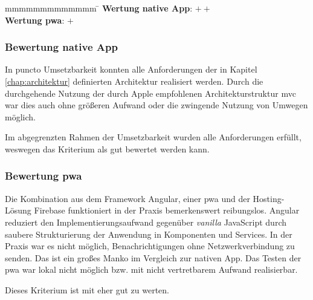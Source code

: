 \begin{tabbing}
	mmmmmmmmmmmmm				\= \kill
	\textbf{Wertung native App}: \> $++$ \\
	\textbf{Wertung \ac{pwa}}: \> $+$
\end{tabbing}

\subsubsection{Bewertung native App}
In puncto Umsetzbarkeit konnten alle Anforderungen der in Kapitel \ref{chap:architektur} definierten Architektur realisiert werden. Durch die durchgehende Nutzung der durch Apple empfohlenen Architekturstruktur \ac{mvc} war dies auch ohne größeren Aufwand oder die zwingende Nutzung von Umwegen möglich.

Im abgegrenzten Rahmen der Umsetzbarkeit wurden alle Anforderungen erfüllt, weswegen das Kriterium als gut bewertet werden kann.

\subsubsection{Bewertung \ac{pwa}}
Die Kombination aus dem Framework Angular, einer \ac{pwa} und der Hosting-Lösung Firebase funktioniert in der Praxis bemerkenswert reibungslos. Angular reduziert den Implementierungsaufwand gegenüber \textit{vanilla} JavaScript durch saubere Strukturierung der Anwendung in Komponenten und Services. In der Praxis war es nicht möglich, Benachrichtigungen ohne Netzwerkverbindung zu senden. Das ist ein großes Manko im Vergleich zur nativen App. Das Testen der \ac{pwa} war lokal nicht möglich bzw. mit nicht vertretbarem Aufwand realisierbar.

Dieses Kriterium ist mit eher gut zu werten.


